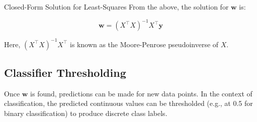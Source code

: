 \begin{definitionbox}{Closed-Form Solution for Least-Squares}
From the above, the solution for $\textbf{w}$ is:

$$
    \textbf{w} = (X^\top X)^{-1} X^\top \textbf{y}
$$
    
\end{definitionbox}


Here, $(X^\top X)^{-1} X^\top$ is known as the Moore-Penrose pseudoinverse of $X$. 

\subsection{Classifier Thresholding}
Once $\textbf{w}$ is found, predictions can be made for new data points. In the context of classification, the predicted continuous values can be thresholded (e.g., at 0.5 for binary classification) to produce discrete class labels.








